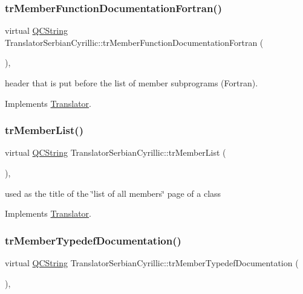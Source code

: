 \subsubsection{\texorpdfstring{trMemberFunctionDocumentationFortran()}{trMemberFunctionDocumentationFortran()}}
{\footnotesize\ttfamily virtual \mbox{\hyperlink{class_q_c_string}{Q\+C\+String}} Translator\+Serbian\+Cyrillic\+::tr\+Member\+Function\+Documentation\+Fortran (\begin{DoxyParamCaption}{ }\end{DoxyParamCaption})\hspace{0.3cm}{\ttfamily [inline]}, {\ttfamily [virtual]}}

header that is put before the list of member subprograms (Fortran). 

Implements \mbox{\hyperlink{class_translator}{Translator}}.

\mbox{\label{class_translator_serbian_cyrillic_ae6eacfa68ac06191395999cbaaab5170}} 
\subsubsection{\texorpdfstring{trMemberList()}{trMemberList()}}
{\footnotesize\ttfamily virtual \mbox{\hyperlink{class_q_c_string}{Q\+C\+String}} Translator\+Serbian\+Cyrillic\+::tr\+Member\+List (\begin{DoxyParamCaption}{ }\end{DoxyParamCaption})\hspace{0.3cm}{\ttfamily [inline]}, {\ttfamily [virtual]}}

used as the title of the \char`\"{}list of all members\char`\"{} page of a class 

Implements \mbox{\hyperlink{class_translator}{Translator}}.

\mbox{\label{class_translator_serbian_cyrillic_a752841f3a2514a9fa1c47244903e4712}} 
\subsubsection{\texorpdfstring{trMemberTypedefDocumentation()}{trMemberTypedefDocumentation()}}
{\footnotesize\ttfamily virtual \mbox{\hyperlink{class_q_c_string}{Q\+C\+String}} Translator\+Serbian\+Cyrillic\+::tr\+Member\+Typedef\+Documentation (\begin{DoxyParamCaption}{ }\end{DoxyParamCaption})\hspace{0.3cm}{\ttfamily [inline]}, {\ttfamily [virtual]}}

